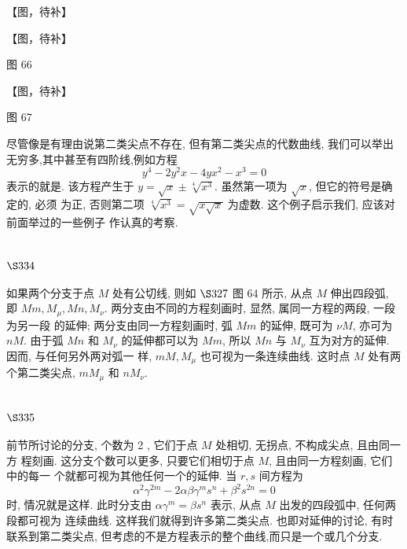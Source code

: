 【图，待补】


【图，待补】

图 66


【图，待补】

图 67

尽管像是有理由说第二类尖点不存在, 但有第二类尖点的代数曲线, 我们可以举出 无穷多,其中甚至有四阶线,例如方程
\[
y^{4}-2 y^{2} x-4 y x^{2}-x^{3}=0
\]
表示的就是. 该方程产生于 $y=\sqrt{x} \pm \sqrt[4]{x^{3}}$. 虽然第一项为 $\sqrt{x}$, 但它的符号是确定的, 必须 为正, 否则第二项 $\sqrt[4]{x^{3}}=\sqrt{x \sqrt{x}}$ 为虚数. 这个例子启示我们, 应该对前面举过的一些例子 作认真的考察.

\section{$\S 334$}

如果两个分支于点 $M$ 处有公切线, 则如 $\S 327$ 图 64 所示, 从点 $M$ 伸出四段弧, 即 $M m, M_{\mu}, M n, M_{\nu}$. 两分支由不同的方程刻画时, 显然, 属同一方程的两段, 一段为另一段 的延伸; 两分支由同一方程刻画时, 弧 $M m$ 的延伸, 既可为 $\nu M$, 亦可为 $n M$. 由于弧 $M n$ 和 $M_{\nu}$ 的延伸都可以为 $M m$, 所以 $M n$ 与 $M_{\nu}$ 互为对方的延伸. 因而, 与任何另外两对弧一 样, $m M, M_{\mu}$ 也可视为一条连续曲线. 这时点 $M$ 处有两个第二类尖点, $m M_{\mu}$ 和 $n M_{\nu}$.

\section{$\S 335$}

前节所讨论的分支, 个数为 2 , 它们于点 $M$ 处相切, 无拐点, 不构成尖点, 且由同一方 程刻画. 这分支个数可以更多, 只要它们相切于点 $M$, 且由同一方程刻画, 它们中的每一 个就都可视为其他任何一个的延伸. 当 $r, s$ 间方程为
\[
\alpha^{2} \gamma^{2 m}-2 \alpha \beta \gamma^{m} s^{n}+\beta^{2} s^{2 n}=0
\]
时, 情况就是这样. 此时分支由 $\alpha \gamma^{m}=\beta s^{n}$ 表示, 从点 $M$ 出发的四段弧中, 任何两段都可视为 连续曲线. 这样我们就得到许多第二类尖点. 也即对延伸的讨论, 有时联系到第二类尖点, 但考虑的不是方程表示的整个曲线,而只是一个或几个分支. 

